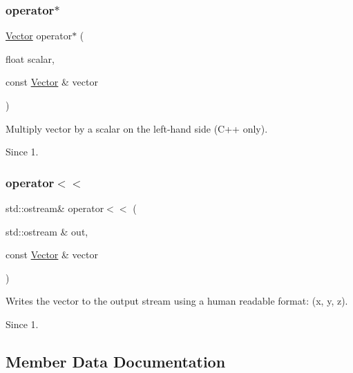 \subsubsection{\texorpdfstring{operator$\ast$}{operator*}}
{\footnotesize\ttfamily \hyperlink{struct_leap_1_1_vector}{Vector} operator$\ast$ (\begin{DoxyParamCaption}\item[{float}]{scalar,  }\item[{const \hyperlink{struct_leap_1_1_vector}{Vector} \&}]{vector }\end{DoxyParamCaption})\hspace{0.3cm}{\ttfamily [friend]}}

Multiply vector by a scalar on the left-\/hand side (C++ only).


\begin{DoxyCodeInclude}
\end{DoxyCodeInclude}
 \begin{DoxySince}{Since}
1. 
\end{DoxySince}
\mbox{\label{struct_leap_1_1_vector_ae295e87eb813266c27e75d2809df2acc}} 
\subsubsection{\texorpdfstring{operator$<$$<$}{operator<<}}
{\footnotesize\ttfamily std\+::ostream\& operator$<$$<$ (\begin{DoxyParamCaption}\item[{std\+::ostream \&}]{out,  }\item[{const \hyperlink{struct_leap_1_1_vector}{Vector} \&}]{vector }\end{DoxyParamCaption})\hspace{0.3cm}{\ttfamily [friend]}}

Writes the vector to the output stream using a human readable format\+: (x, y, z). \begin{DoxySince}{Since}
1. 
\end{DoxySince}


\subsection{Member Data Documentation}
\mbox{\label{struct_leap_1_1_vector_a58ab75fe089da2070f5dcef82c9a578a}} 

